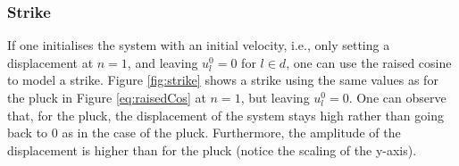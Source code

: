 \subsubsection{Strike}\label{sec:strike}
If one initialises the system with an initial velocity, i.e., only setting a displacement at $n=1$, and leaving $u^0_l = 0$ for $l\in d$, one can use the raised cosine to model a strike. Figure \ref{fig:strike} shows a strike using the same values as for the pluck in Figure \ref{eq:raisedCos} at $n=1$, but leaving $u_l^0 = 0$. One can observe that, for the pluck, the displacement of the system stays high rather than going back to 0 as in the case of the pluck. Furthermore, the amplitude of the displacement is higher than for the pluck (notice the scaling of the y-axis).%

